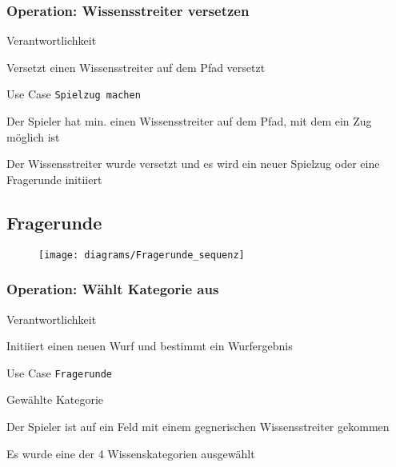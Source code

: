 \subsubsection{Operation: Wissensstreiter versetzen}
\begin{labeling}[:]{Verantwortlichkeit}
\item [Verantwortlichkeit] Versetzt einen Wissensstreiter auf dem Pfad versetzt
\item [Referenzen] Use Case \texttt{Spielzug machen}
\item [Output] 
\item [Vorbedingungen] Der Spieler hat min. einen Wissensstreiter auf dem Pfad, mit dem ein Zug möglich ist
\item [Nachbedingungen] Der Wissensstreiter wurde versetzt und es wird ein neuer Spielzug oder eine Fragerunde initiiert
\end{labeling}

\newpage
\subsection{Fragerunde}
\begin{figure}[h]
  \begin{center}
    \texttt{[image: diagrams/Fragerunde\_sequenz]}
  \end{center}
\end{figure}

\subsubsection{Operation: Wählt Kategorie aus}
\begin{labeling}[:]{Verantwortlichkeit}
\item [Verantwortlichkeit] Initiiert einen neuen Wurf und bestimmt ein Wurfergebnis
\item [Referenzen] Use Case \texttt{Fragerunde}
\item [Output] Gewählte Kategorie
\item [Vorbedingungen] Der Spieler ist auf ein Feld mit einem gegnerischen Wissensstreiter gekommen
\item [Nachbedingungen] Es wurde eine der 4 Wissenskategorien ausgewählt
\end{labeling}


